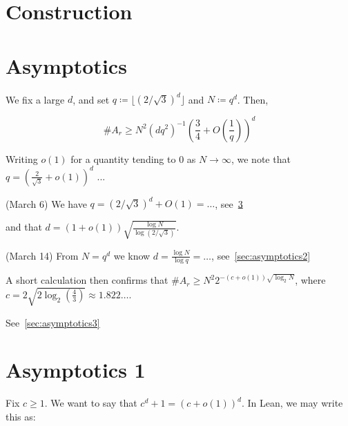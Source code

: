\documentclass{article}[11px]
\begin{document}
\tableofcontents

\section{Construction}

\pagebreak

\section{Asymptotics}

We fix a large \(d\), and set \(q \coloneqq \lfloor(2 / \sqrt{3})^d\rfloor\) and \(N \coloneqq q^d\). Then,

\[
  \#A_r \geq N^2 (dq^2)^{-1} \left(\frac{3}{4} + O\left(\frac{1}{q}\right)\right)^d
\]

Writing \(o(1)\) for a quantity tending to \(0\) as \(N \to \infty\), we note that \(q = \left(\frac{2}{\sqrt{3}} + o(1)\right)^d\) ...

\begin{theorem}{\ok (March 6)}{}
We have \(q = (2 / \sqrt{3})^d + O(1) = \ldots\), see~\ref{sec:asymptotics1}
\end{theorem}

and that \(d = (1 + o(1))\sqrt{\frac{\log N}{\log(2 / \sqrt{3})}}\).

\begin{theorem}{\ok (March 14)}{}
  From \(N = q^d\) we know \(d = \frac{\log N}{\log q} = \ldots\), see~\ref{sec:asymptotics2}
\end{theorem}

A short calculation then confirms that \(\#A_r \geq N^2 2^{-(c + o(1))\sqrt{\log_2 N}}\), where \(c = 2\sqrt{2 \log_2\left(\frac{4}{3}\right)} \approx 1.822\ldots\).


\begin{theorem}{}{}
  See~\ref{sec:asymptotics3}
\end{theorem}

\pagebreak

\section{Asymptotics 1}\label{sec:asymptotics1}

Fix \(c \geq 1\). We want to say that \(c^d + 1 = (c + o(1))^d\). In Lean, we may write this as:
\end{document}
